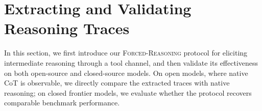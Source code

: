\documentclass[10pt,letterpaper]{article}
\newcommand{\method}{\textsc{Forced-Reasoning}}
\begin{document}

\section{Extracting and Validating Reasoning Traces}
In this section, we first introduce our \method{} protocol for eliciting intermediate reasoning through a tool channel, and then validate its effectiveness on both open-source and closed-source models. On open models, where native CoT is observable, we directly compare the extracted traces with native reasoning; on closed frontier models, we evaluate whether the protocol recovers comparable benchmark performance.
\end{document}
